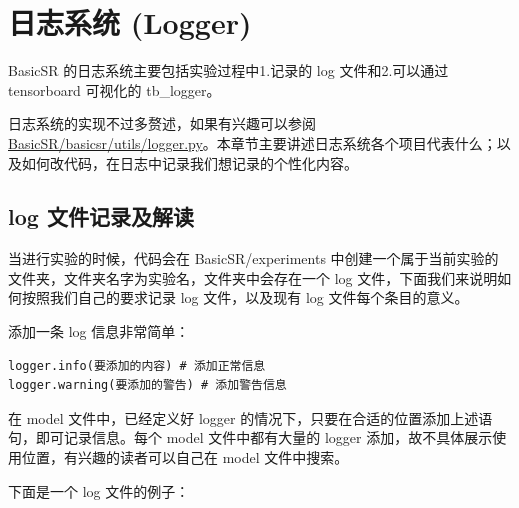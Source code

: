 \documentclass[../main.tex]{subfiles}
\begin{document}
\section{日志系统 (Logger)}

BasicSR 的日志系统主要包括实验过程中1.记录的 log 文件和2.可以通过 tensorboard 可视化的 tb\_logger。

日志系统的实现不过多赘述，如果有兴趣可以参阅 \href{https://github.com/XPixelGroup/BasicSR/blob/master/basicsr/utils/logger.py}{BasicSR/basicsr/utils/logger.py}。本章节主要讲述日志系统各个项目代表什么；以及如何改代码，在日志中记录我们想记录的个性化内容。

\subsection{log 文件记录及解读}

当进行实验的时候，代码会在 BasicSR/experiments 中创建一个属于当前实验的文件夹，文件夹名字为实验名，文件夹中会存在一个 log 文件，下面我们来说明如何按照我们自己的要求记录 log 文件，以及现有 log 文件每个条目的意义。

\begin{hl} %

添加一条 log 信息非常简单：

\begin{verbatim}
logger.info(要添加的内容) # 添加正常信息
logger.warning(要添加的警告) # 添加警告信息
\end{verbatim}
\end{hl}

在 model 文件中，已经定义好 logger 的情况下，只要在合适的位置添加上述语句，即可记录信息。每个 model 文件中都有大量的 logger 添加，故不具体展示使用位置，有兴趣的读者可以自己在 model 文件中搜索。

下面是一个 log 文件的例子：
\end{document}
